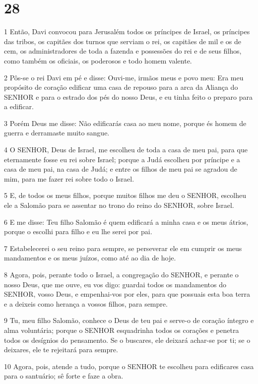 \chapter{28}

\par 1 Então, Davi convocou para Jerusalém todos os príncipes de Israel, os príncipes das tribos, os capitães dos turnos que serviam o rei, os capitães de mil e os de cem, os administradores de toda a fazenda e possessões do rei e de seus filhos, como também os oficiais, os poderosos e todo homem valente.
\par 2 Pôs-se o rei Davi em pé e disse: Ouvi-me, irmãos meus e povo meu: Era meu propósito de coração edificar uma casa de repouso para a arca da Aliança do SENHOR e para o estrado dos pés do nosso Deus, e eu tinha feito o preparo para a edificar.
\par 3 Porém Deus me disse: Não edificarás casa ao meu nome, porque és homem de guerra e derramaste muito sangue.
\par 4 O SENHOR, Deus de Israel, me escolheu de toda a casa de meu pai, para que eternamente fosse eu rei sobre Israel; porque a Judá escolheu por príncipe e a casa de meu pai, na casa de Judá; e entre os filhos de meu pai se agradou de mim, para me fazer rei sobre todo o Israel.
\par 5 E, de todos os meus filhos, porque muitos filhos me deu o SENHOR, escolheu ele a Salomão para se assentar no trono do reino do SENHOR, sobre Israel.
\par 6 E me disse: Teu filho Salomão é quem edificará a minha casa e os meus átrios, porque o escolhi para filho e eu lhe serei por pai.
\par 7 Estabelecerei o seu reino para sempre, se perseverar ele em cumprir os meus mandamentos e os meus juízos, como até ao dia de hoje.
\par 8 Agora, pois, perante todo o Israel, a congregação do SENHOR, e perante o nosso Deus, que me ouve, eu vos digo: guardai todos os mandamentos do SENHOR, vosso Deus, e empenhai-vos por eles, para que possuais esta boa terra e a deixeis como herança a vossos filhos, para sempre.
\par 9 Tu, meu filho Salomão, conhece o Deus de teu pai e serve-o de coração íntegro e alma voluntária; porque o SENHOR esquadrinha todos os corações e penetra todos os desígnios do pensamento. Se o buscares, ele deixará achar-se por ti; se o deixares, ele te rejeitará para sempre.
\par 10 Agora, pois, atende a tudo, porque o SENHOR te escolheu para edificares casa para o santuário; sê forte e faze a obra.
